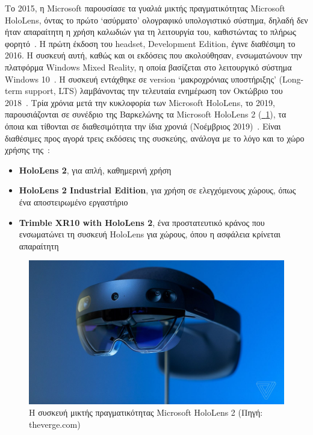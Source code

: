 
Το 2015, η Microsoft παρουσίασε τα γυαλιά μικτής πραγματικότητας Microsoft HoloLens, όντας το πρώτο `ασύρματο' ολογραφικό υπολογιστικό σύστημα, δηλαδή δεν ήταν απαραίτητη η χρήση καλωδιών για τη λειτουργία του, καθιστώντας το πλήρως φορητό~\cite{a2021_hololens}. Η πρώτη έκδοση του headset, Development Edition, έγινε διαθέσιμη το 2016. Η συσκευή αυτή, καθώς και οι εκδόσεις που ακολούθησαν, ενσωματώνουν την πλατφόρμα Windows Mixed Reality, η οποία βασίζεται στο λειτουργικό σύστημα Windows 10~\cite{kipman_2016_announcing}. Η συσκευή εντάχθηκε σε version `μακροχρόνιας υποστήριξης' (Long-term support, LTS) λαμβάνοντας την τελευταία ενημέρωση τον Οκτώβριο του 2018~\cite{a2023_hololens}\cite{bowden_2019_the}. Τρία χρόνια μετά την κυκλοφορία των Microsoft HoloLens, το 2019, παρουσιάζονται σε συνέδριο της Βαρκελώνης τα Microsoft HoloLens 2 (\hyperref[fig:hololensDevice]{\schema~\ref*{fig:hololensDevice}}), τα όποια και τίθονται σε διαθεσιμότητα την ίδια χρονιά (Νοέμβριος 2019)~\cite{white_2019_microsoft}. Είναι διαθέσιμες προς αγορά τρεις εκδόσεις της συσκεύης, ανάλογα με το λόγο και το χώρο χρήσης της~\cite{microsoft_2019_hololens}: 
\begin{itemize}
    \item \textbf{HoloLens 2}, για απλή, καθημερινή χρήση
    \item \textbf{HoloLens 2 Industrial Edition}, για χρήση σε ελεγχόμενους χώρους, όπως ένα αποστειρωμένο εργαστήριο
    \item \textbf{Trimble XR10 with HoloLens 2}, ένα προστατευτικό κράνος που ενσωματώνει τη συσκευή HoloLens για χώρους, όπου η ασφάλεια κρίνεται απαραίτητη
\end{itemize}
\begin{figure}[!ht]
    \centering
    \includegraphics[width=130mm]{images/microsoft_hololens_2.jpg}
    \caption[Η συσκευή μικτής πραγματικότητας Microsoft HoloLens 2]{Η συσκευή μικτής πραγματικότητας Microsoft HoloLens 2 {\footnotesize (Πηγή: theverge.com)}}\label{fig:hololensDevice}
\end{figure}

